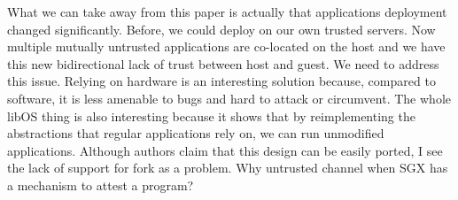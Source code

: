 What we can take away from this paper is actually that applications deployment changed significantly.
Before, we could deploy on our own trusted servers.
Now multiple mutually untrusted applications are co-located on the host and we have this new bidirectional lack of trust between host and guest.
We need to address this issue.
Relying on hardware is an interesting solution because, compared to software, it is less amenable to bugs and hard to attack or circumvent.
The whole libOS thing is also interesting because it shows that by reimplementing the abstractions that regular applications rely on, we can run unmodified applications.
Although authors claim that this design can be easily ported, I see the lack of support for fork as a problem.
Why untrusted channel when SGX has a mechanism to attest a program?




